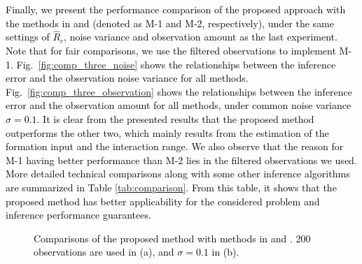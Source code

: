 \documentclass[12pt,journal,draftclsnofoot,onecolumn]{IEEEtran}
\begin{document}
\textcolor{black}{
Finally, we present the performance comparison of the proposed approach with the methods in \cite{matta2018consistent} and \cite{8985069} (denoted as M-1 and M-2, respectively), under the same settings of $\hat{R}_c$, noise variance and observation amount as the last experiment. 
Note that for fair comparisons, we use the filtered observations to implement M-1. 
Fig.~\ref{fig:comp_three_noise} shows the relationships between the inference error and the observation noise variance for all methods. 
Fig.~\ref{fig:comp_three_observation} shows the relationships between the inference error and the observation amount for all methods, under common noise variance $\sigma=0.1$. 
It is clear from the presented results that the proposed method outperforms the other two, which mainly results from the estimation of the formation input and the interaction range. 
We also observe that the reason for M-1 having better performance than M-2 lies in the filtered observations we used. 
More detailed technical comparisons along with some other inference algorithms are summarized in Table \ref{tab:comparison}. 
From this table, it shows that the proposed method has better applicability for the considered problem and inference performance guarantees. 
}


\begin{figure}[t]
\centering
{}
\hspace{-0.6cm}
\vspace{-5pt}
\caption{\textcolor{black}{Comparisons of the proposed method with methods in \cite{matta2018consistent} and \cite{8985069}. 200 observations are used in (a), and $\sigma=0.1$ in (b).}}
\label{fig:compare_three}
\end{figure}

\end{document}
